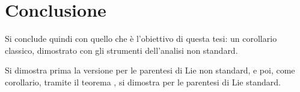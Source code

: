 \section{Conclusione}
Si conclude quindi con quello che è l'obiettivo di questa tesi: un corollario classico, dimostrato con gli strumenti dell'analisi non standard.

Si dimostra prima la versione per le parentesi di Lie non standard, e poi, come corollario, tramite il teorema , si dimostra per le parentesi di Lie standard. 

